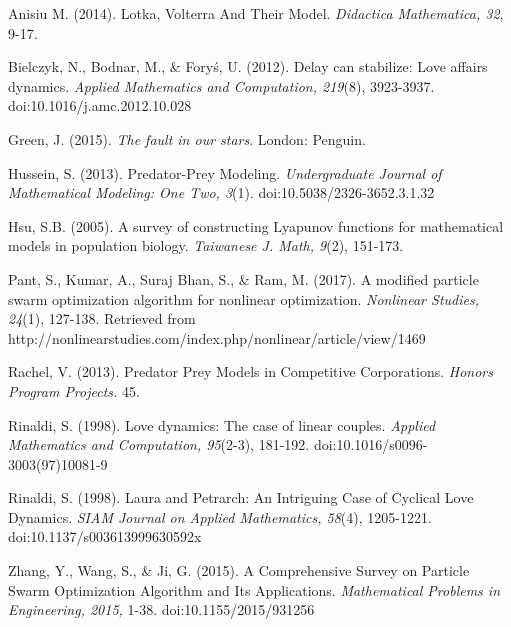 \documentclass{article}
\begin{document}
 \newpage
\begin{thebibliography}{9}

\hypertarget{source1}{}
Anisiu M. (2014). Lotka, Volterra And Their Model. \textit{Didactica Mathematica, 32}, 9-17.

\hypertarget{source2}{}
Bielczyk, N., Bodnar, M., \& Foryś, U. (2012). Delay can stabilize: Love affairs dynamics. \textit{Applied Mathematics and Computation, 219}(8), 3923-3937. doi:10.1016/j.amc.2012.10.028

\hypertarget{source3}{}
Green, J. (2015). \textit{The fault in our stars}. London: Penguin.

\hypertarget{source4}{}
Hussein, S. (2013). Predator-Prey Modeling. \textit{Undergraduate Journal of Mathematical Modeling: One Two, 3}(1). doi:10.5038/2326-3652.3.1.32

\hypertarget{source5}{}
Hsu, S.B. (2005). A survey of constructing Lyapunov functions for mathematical models in
population biology. \textit{Taiwanese J. Math, 9}(2), 151-173.

\hypertarget{source6}{}
Pant, S., Kumar, A., Suraj Bhan, S., \& Ram, M. (2017). A modified particle swarm optimization algorithm for nonlinear optimization. \textit{Nonlinear Studies, 24}(1), 127-138. Retrieved from http://nonlinearstudies.com/index.php/nonlinear/article/view/1469

\hypertarget{source7}{}
Rachel, V. (2013). Predator Prey Models in Competitive Corporations. \textit{Honors Program Projects.} 45.

\hypertarget{source8}{}
Rinaldi, S. (1998). Love dynamics: The case of linear couples. \textit{Applied Mathematics and Computation, 95}(2-3), 181-192. doi:10.1016/s0096-3003(97)10081-9

\hypertarget{source9}{}
Rinaldi, S. (1998). Laura and Petrarch: An Intriguing Case of Cyclical Love Dynamics. \textit{SIAM Journal on Applied Mathematics, 58}(4), 1205-1221. doi:10.1137/s003613999630592x

\hypertarget{source10}{}
Zhang, Y., Wang, S., \& Ji, G. (2015). A Comprehensive Survey on Particle Swarm Optimization Algorithm and Its Applications. \textit{Mathematical Problems in Engineering, 2015,} 1-38. doi:10.1155/2015/931256


\end{thebibliography}
\end{document}

